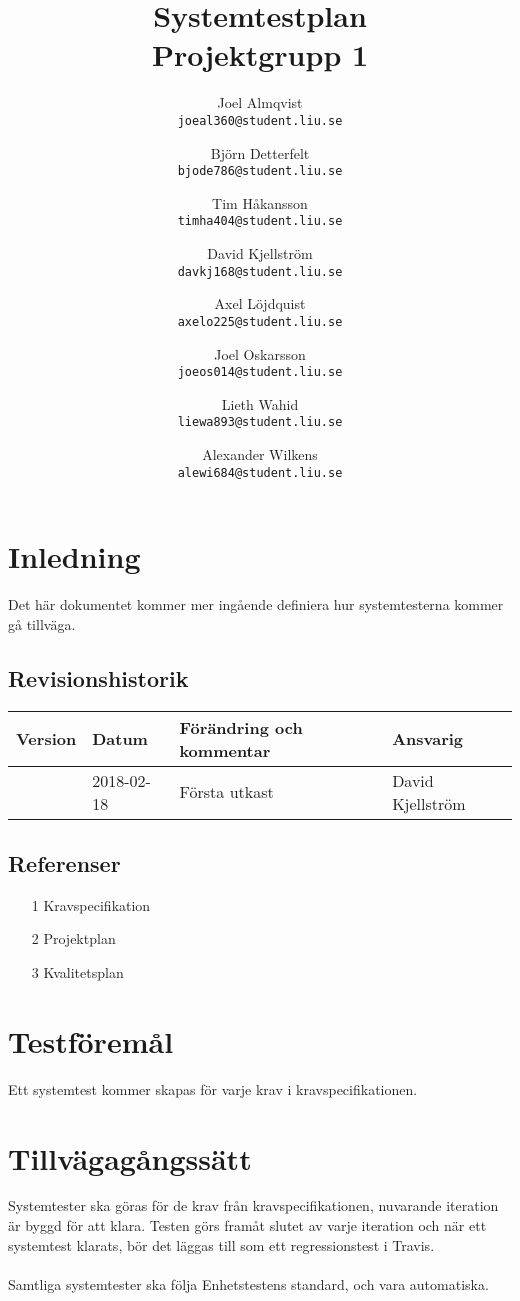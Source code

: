 \documentclass[10pt]{article}
\title{Systemtestplan\\
    \large Projektgrupp 1}
\author{
    Joel Almqvist\\
    \texttt{joeal360@student.liu.se}
    \and
    Björn Detterfelt\\
    \texttt{bjode786@student.liu.se}
    \and
    Tim Håkansson\\
    \texttt{timha404@student.liu.se}
    \and
    David Kjellström\\
    \texttt{davkj168@student.liu.se}
    \and
    Axel Löjdquist\\
    \texttt{axelo225@student.liu.se}
    \and
    Joel Oskarsson\\
    \texttt{joeos014@student.liu.se}
    \and
    Lieth Wahid\\
    \texttt{liewa893@student.liu.se}
    \and
    Alexander Wilkens\\
    \texttt{alewi684@student.liu.se}
}
\begin{document}
\maketitle
\pagebreak
\tableofcontents
\pagebreak
{}
\section{Inledning}
	Det här dokumentet kommer mer ingående definiera hur systemtesterna kommer gå tillväga.
	\subsection{Revisionshistorik}

	
	\begin{center}
 	   \begin{tabular}{| l | l | l |  l | }
 	       \hline
 	       \textbf{Version} & \textbf{Datum} & \textbf{Förändring och kommentar} & \textbf{Ansvarig} \\
 	       \hline
 	       \centering 0.1 & 2018-02-18 & Första utkast & David Kjellström\\
 	       \hline
 	   \end{tabular}
	\end{center}

  
	
	\subsection{Referenser}
		\begin{itemize}
		\item [1] Kravspecifikation
		\item [2] Projektplan
		\item [3] Kvalitetsplan
		\end{itemize}

	
\section{Testföremål}
	Ett systemtest kommer skapas för varje krav i kravspecifikationen.

	
	
	


\section{Tillvägagångssätt}
	Systemtester ska göras för de krav från kravspecifikationen, nuvarande iteration är byggd för att klara. Testen görs framåt slutet av varje iteration och när ett systemtest klarats, bör det läggas till som ett regressionstest i Travis.\\
	\\
	Samtliga systemtester ska följa Enhetstestens standard, och vara automatiska. 		
	
\end{document}
